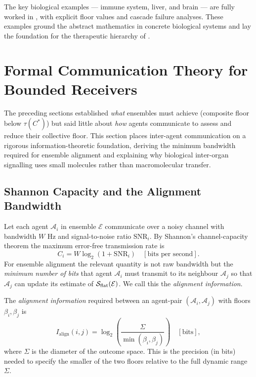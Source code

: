 The key biological examples — immune system, liver, and brain — are fully
worked in ,
with explicit floor values and cascade failure analyses.  These examples
ground the abstract mathematics in concrete biological systems and lay the
foundation for the therapeutic hierarchy of .

\section{Formal Communication Theory for Bounded Receivers}
\label{sec:ch02b-communication-theory}

The preceding sections established \emph{what} ensembles must achieve
(composite floor below $\tau(C^*)$) but said little about \emph{how} agents
communicate to assess and reduce their collective floor.  This section places
inter-agent communication on a rigorous information-theoretic foundation,
deriving the minimum bandwidth required for ensemble alignment and explaining
why biological inter-organ signalling uses small molecules rather than
macromolecular transfer.

\subsection{Shannon Capacity and the Alignment Bandwidth}

Let each agent $\mathcal{A}_i$ in ensemble $\mathcal{E}$ communicate over a
noisy channel with bandwidth $W$ Hz and signal-to-noise ratio $\mathrm{SNR}_i$.
By Shannon's channel-capacity theorem the maximum error-free transmission rate
is
\begin{equation}
  C_i = W \log_2(1 + \mathrm{SNR}_i) \quad [\text{bits per second}].
  \label{eq:ch02b-shannon-capacity}
\end{equation}
For ensemble alignment the relevant quantity is not raw bandwidth but the
\emph{minimum number of bits} that agent $\mathcal{A}_i$ must transmit to its
neighbour $\mathcal{A}_j$ so that $\mathcal{A}_j$ can update its estimate of
$\mathcal{S}_{\mathrm{flat}}(\mathcal{E})$.  We call this the
\emph{alignment information}.

\begin{definition}
\label{def:ch02b-alignment-info}
The \emph{alignment information} required between an agent-pair
$(\mathcal{A}_i, \mathcal{A}_j)$ with floors $\beta_i, \beta_j$ is
\begin{equation}
  I_{\mathrm{align}}(i,j)
  = \log_2\!\left(\frac{\Sigma}{\min(\beta_i, \beta_j)}\right) \quad [\text{bits}],
  \label{eq:ch02b-alignment-info}
\end{equation}
where $\Sigma$ is the diameter of the outcome space.  This is the precision
(in bits) needed to specify the smaller of the two floors relative to the
full dynamic range $\Sigma$.
\end{definition}

